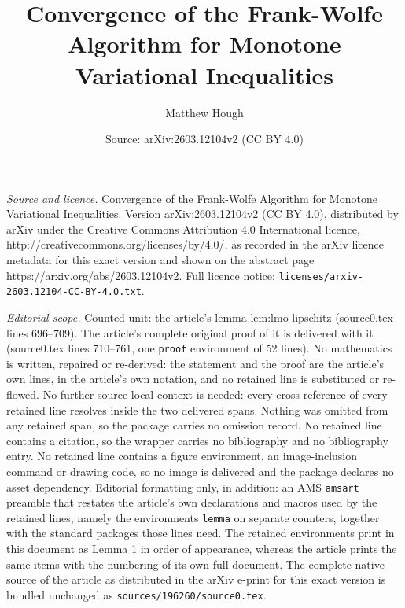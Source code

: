\documentclass[10pt,a4paper]{amsart}
\title{Convergence of the Frank-Wolfe Algorithm for Monotone Variational Inequalities}
\author{Matthew Hough}
\date{Source: arXiv:2603.12104v2 (CC BY 4.0)}
\begin{document}
\maketitle

\noindent\emph{Source and licence.} Convergence of the Frank-Wolfe Algorithm for Monotone Variational Inequalities. Version arXiv:2603.12104v2 (CC BY 4.0), distributed by arXiv under the Creative Commons Attribution 4.0 International licence, http://creativecommons.org/licenses/by/4.0/, as recorded in the arXiv licence metadata for this exact version and shown on the abstract page https://arxiv.org/abs/2603.12104v2. Full licence notice: \texttt{licenses/arxiv-2603.12104-CC-BY-4.0.txt}.\par\smallskip

\noindent\textit{Editorial scope.} Counted unit: the article's lemma lem:lmo-lipschitz (source0.tex lines 696--709). The article's complete original proof of it is delivered with it (source0.tex lines 710--761, one \texttt{proof} environment of 52 lines). No mathematics is written, repaired or re-derived: the statement and the proof are the article's own lines, in the article's own notation, and no retained line is substituted or re-flowed.  No further source-local context is needed: every cross-reference of every retained line resolves inside the two delivered spans.  Nothing was omitted from any retained span, so the package carries no omission record.  No retained line contains a citation, so the wrapper carries no bibliography and no bibliography entry.  No retained line contains a figure environment, an image-inclusion command or drawing code, so no image is delivered and the package declares no asset dependency.  Editorial formatting only, in addition: an AMS \texttt{amsart} preamble that restates the article's own declarations and macros used by the retained lines, namely the environments \texttt{lemma} on separate counters, together with the standard packages those lines need.  The retained environments print in this document as Lemma 1 in order of appearance, whereas the article prints the same items with the numbering of its own full document.  The complete native source of the article as distributed in the arXiv e-print for this exact version is bundled unchanged as \texttt{sources/196260/source0.tex}.
\end{document}
